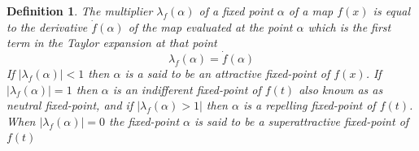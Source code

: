 \documentclass{elsarticle}
\newtheorem{definition}{Definition}
\begin{document}
\begin{definition}
  The multiplier $\lambda_f (\alpha)$ of a fixed point $\alpha$ of a map $f
  (x)$ is equal to the derivative $\dot{f} (\alpha)$ of the map evaluated at
  the point $\alpha$ which is the first term in the Taylor expansion at that
  point
  \begin{equation}
    \lambda_f (\alpha) = \dot{f} (\alpha)
  \end{equation}
  If $| \lambda_f (\alpha) | < 1$ then $\alpha$ is a said to be an attractive
  fixed-point of $f (x)$. If $| \lambda_f (\alpha) | = 1$ then $\alpha$ is an
  indifferent fixed-point of $f (t)$ also known as as neutral fixed-point, and
  if $| \lambda_f (\alpha) > 1 |$ then $\alpha$ is a repelling fixed-point of
  $f (t)$. When $| \lambda_f (\alpha) | = 0$ the fixed-point $\alpha$ is said
  to be a superattractive fixed-point of $f
  (t)${\cite[3.]{raadstrom1953iteration}}
\end{definition}
\end{document}
